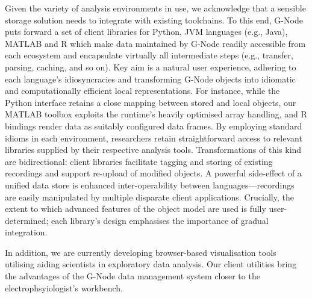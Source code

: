 \documentclass[a4paper]{article}
\begin{document}
Given the variety of analysis environments in use, we acknowledge that
a sensible storage solution needs to integrate with existing
toolchains. To this end, G-Node puts forward a set of client libraries
for Python, JVM languages (e.g., Java), MATLAB and R which make data
maintained by G-Node readily accessible from each ecosystem and
encapsulate virtually all intermediate steps (e.g., transfer, parsing,
caching, and so on). Key aim is a natural user experience, adhering to
each language's idiosyncracies and transforming G-Node objects into
idiomatic and computationally efficient local representations. For
instance, while the Python interface retains a close mapping between
stored and local objects, our MATLAB toolbox exploits the runtime's
heavily optimised array handling, and R bindings render data as
suitably configured data frames. By employing standard idioms in each
environment, researchers retain straightforward access to relevant
libraries supplied by their respective analysis tools. Transformations
of this kind are bidirectional: client libraries facilitate tagging
and storing of existing recordings and support re-upload of modified
objects. A powerful side-effect of a unified data store is enhanced
inter-operability between languages---recordings are easily
manipulated by multiple disparate client applications. Crucially, the
extent to which advanced features of the object model are used is
fully user-determined; each library's design emphasises the importance
of gradual integration.

In addition, we are currently developing browser-based visualisation
tools utilising aiding scientists in exploratory data analysis. Our
client utilities bring the advantages of the G-Node data management system
closer to the electrophsyiologist's workbench.
\end{document}
